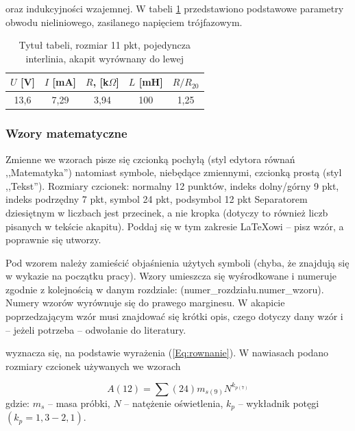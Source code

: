 \documentclass[12pt,twoside]{article}
\begin{document}
\begin{example}
[\ldots] oraz indukcyjności wzajemnej. W tabeli \ref{Tab:tabela} przedstawiono podstawowe parametry obwodu nieliniowego, zasilanego napięciem trójfazowym.
\end{example}

\begin{table}[ht]
\caption{Tytuł tabeli, rozmiar 11 pkt, pojedyncza interlinia, akapit wyrównany do lewej}
\centering		
	\begin{tabular}{|c|c|c|c|c|}	
		\hline
		$U$ [V] & $I$ [mA] & $R$, [k$\Omega$] & $L$ [mH] & $R/R_{20}$ \\
		\hline
		13,6 & 7,29 & 3,94 & 100 & 1,25 \\
		\hline
	\end{tabular}	
	
\label{Tab:tabela}
\end{table}	

\subsubsection{Wzory matematyczne}

Zmienne we wzorach pisze się czcionką pochyłą (styl edytora równań ,,Matematyka'') natomiast symbole, niebędące zmiennymi, czcionką prostą (styl ,,Tekst'').
Rozmiary czcionek: normalny 12 punktów, indeks dolny/górny 9 pkt, indeks podrzędny 7 pkt, symbol 24 pkt, podsymbol 12 pkt Separatorem dziesiętnym w liczbach jest
przecinek, a nie kropka (dotyczy to również liczb pisanych w tekście akapitu). Poddaj się w tym zakresie \LaTeX{}owi -- pisz wzór, a poprawnie się utworzy.


Pod wzorem należy zamieścić objaśnienia użytych symboli (chyba, że znajdują się w wykazie na początku pracy). Wzory umieszcza się wyśrodkowane i numeruje zgodnie
z kolejnością w danym rozdziale: (numer\_rozdziału.numer\_wzoru). Numery wzorów wyrównuje się do prawego marginesu. W akapicie poprzedzającym wzór musi znajdować się krótki opis, czego dotyczy dany wzór i -- jeżeli potrzeba -- odwołanie do literatury.

\begin{example}
[\ldots] wyznacza się, na podstawie wyrażenia (\ref{Eq:rownanie}). W nawiasach podano rozmiary czcionek używanych we wzorach
\end{example}

\begin{equation}
A(12)={\sum}(24)m_{s(9)}N^{k_{p(7)}}
\label{Eq:rownanie}
\end{equation}
gdzie: $m_s$ -- masa próbki, $N$ -- natężenie oświetlenia, $k_p$ -- wykładnik potęgi $(k_p=1,3-2,1)$.\\
\end{document}
